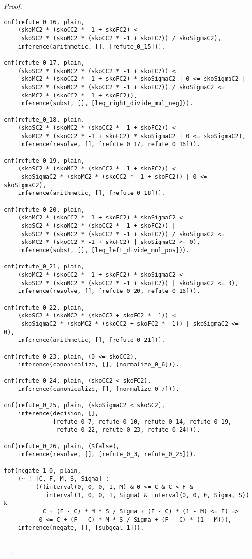 \begin{proof}
\begin{verbatim}
cnf(refute_0_16, plain,
    (skoMC2 * (skoCC2 * -1 + skoFC2) <
     skoSC2 * (skoMC2 * (skoCC2 * -1 + skoFC2)) / skoSigmaC2),
    inference(arithmetic, [], [refute_0_15])).

cnf(refute_0_17, plain,
    (skoSC2 * (skoMC2 * (skoCC2 * -1 + skoFC2)) <
     skoMC2 * (skoCC2 * -1 + skoFC2) * skoSigmaC2 | 0 <= skoSigmaC2 |
     skoSC2 * (skoMC2 * (skoCC2 * -1 + skoFC2)) / skoSigmaC2 <=
     skoMC2 * (skoCC2 * -1 + skoFC2)),
    inference(subst, [], [leq_right_divide_mul_neg])).

cnf(refute_0_18, plain,
    (skoSC2 * (skoMC2 * (skoCC2 * -1 + skoFC2)) <
     skoMC2 * (skoCC2 * -1 + skoFC2) * skoSigmaC2 | 0 <= skoSigmaC2),
    inference(resolve, [], [refute_0_17, refute_0_16])).

cnf(refute_0_19, plain,
    (skoSC2 * (skoMC2 * (skoCC2 * -1 + skoFC2)) <
     skoSigmaC2 * (skoMC2 * (skoCC2 * -1 + skoFC2)) | 0 <= skoSigmaC2),
    inference(arithmetic, [], [refute_0_18])).

cnf(refute_0_20, plain,
    (skoMC2 * (skoCC2 * -1 + skoFC2) * skoSigmaC2 <
     skoSC2 * (skoMC2 * (skoCC2 * -1 + skoFC2)) |
     skoSC2 * (skoMC2 * (skoCC2 * -1 + skoFC2)) / skoSigmaC2 <=
     skoMC2 * (skoCC2 * -1 + skoFC2) | skoSigmaC2 <= 0),
    inference(subst, [], [leq_left_divide_mul_pos])).

cnf(refute_0_21, plain,
    (skoMC2 * (skoCC2 * -1 + skoFC2) * skoSigmaC2 <
     skoSC2 * (skoMC2 * (skoCC2 * -1 + skoFC2)) | skoSigmaC2 <= 0),
    inference(resolve, [], [refute_0_20, refute_0_16])).

cnf(refute_0_22, plain,
    (skoSC2 * (skoMC2 * (skoCC2 + skoFC2 * -1)) <
     skoSigmaC2 * (skoMC2 * (skoCC2 + skoFC2 * -1)) | skoSigmaC2 <= 0),
    inference(arithmetic, [], [refute_0_21])).

cnf(refute_0_23, plain, (0 <= skoCC2),
    inference(canonicalize, [], [normalize_0_6])).

cnf(refute_0_24, plain, (skoCC2 < skoFC2),
    inference(canonicalize, [], [normalize_0_7])).

cnf(refute_0_25, plain, (skoSigmaC2 < skoSC2),
    inference(decision, [],
              [refute_0_7, refute_0_10, refute_0_14, refute_0_19,
               refute_0_22, refute_0_23, refute_0_24])).

cnf(refute_0_26, plain, ($false),
    inference(resolve, [], [refute_0_3, refute_0_25])).

fof(negate_1_0, plain,
    (~ ! [C, F, M, S, Sigma] :
         (((interval(0, 0, 0, 1, M) & 0 <= C & C < F &
            interval(1, 0, 0, 1, Sigma) & interval(0, 0, 0, Sigma, S)) &
           C + (F - C) * M * S / Sigma + (F - C) * (1 - M) <= F) =>
          0 <= C + (F - C) * M * S / Sigma + (F - C) * (1 - M))),
    inference(negate, [], [subgoal_1])).


\end{verbatim}
\end{proof}

